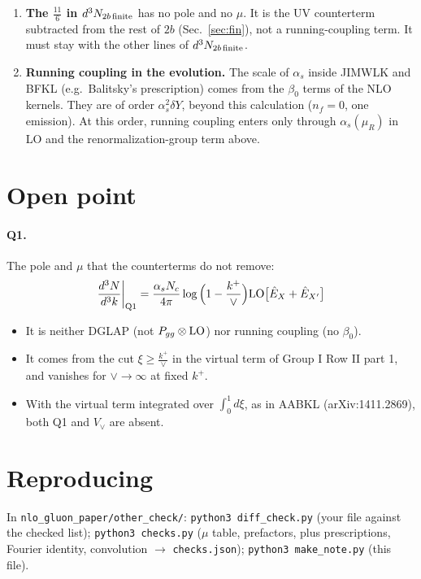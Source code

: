 \documentclass[10pt]{article}
\numberwithin{equation}{section}
\newcommand{\LO}{{\rm LO}}
\begin{document}
\begin{enumerate}
\begin{itemize}
\item The constant depends on the scheme of $\alpha_s$. Under $\alpha_s\to\alpha_s(1+c\,\frac{\alpha_s}{2\pi})$ it shifts by $-c$.
\item It is absorbed completely by $\alpha_s\to\alpha_s(1+2K\frac{\alpha_s}{2\pi})$. That is twice the CMW shift $K\frac{\alpha_s}{2\pi}$ of soft-gluon emission, so here it is not the CMW scheme by itself. In $\overline{MS}$ it stays as a finite term.
\end{itemize}
\item \textbf{The $\frac{11}{6}$ in $d^3N_{2b\,\rm finite}$} has no pole and no $\mu$. It is the UV counterterm subtracted from the rest of $2b$ (Sec.~\ref{sec:fin}), not a running-coupling term. It must stay with the other lines of $d^3N_{2b\,\rm finite}$.
\item \textbf{Running coupling in the evolution.} The scale of $\alpha_s$ inside JIMWLK and BFKL (e.g.\ Balitsky's prescription) comes from the $\beta_0$ terms of the NLO kernels. They are of order $\alpha_s^2\delta Y$, beyond this calculation ($n_f=0$, one emission). At this order, running coupling enters only through $\alpha_s(\mu_R)$ in LO and the renormalization-group term above.
\end{enumerate}

\section{Open point}\label{sec:open}
\paragraph{Q1.} The pole and $\mu$ that the counterterms do not remove:
\begin{equation}
\frac{d^3N}{d^3k}\bigg|_{\rm Q1}=\frac{\alpha_sN_c}{4\pi}\log\Big(1-\frac{k^+}{\vee}\Big)\LO\big[\hat E_X+\hat E_{X'}\big]\label{eq:q1}
\end{equation}
\begin{itemize}
\item It is neither DGLAP (not $P_{gg}\otimes\LO$) nor running coupling (no $\beta_0$).
\item It comes from the cut $\xi\ge\frac{k^+}{\vee}$ in the virtual term of Group I Row II part 1, and vanishes for $\vee\to\infty$ at fixed $k^+$.
\item With the virtual term integrated over $\int_0^1d\xi$, as in AABKL (arXiv:1411.2869), both Q1 and $V_\vee$ are absent.
\end{itemize}

\section*{Reproducing}
In \texttt{nlo\_gluon\_paper/other\_check/}: \texttt{python3 diff\_check.py} (your file against the checked list); \texttt{python3 checks.py} ($\mu$ table, prefactors, plus prescriptions, Fourier identity, convolution $\to$ \texttt{checks.json}); \texttt{python3 make\_note.py} (this file).
\end{document}
